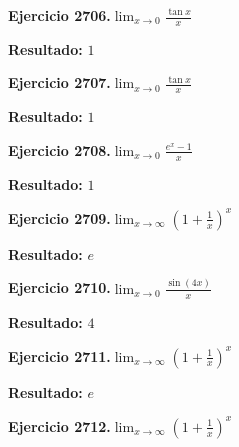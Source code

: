 \documentclass[10pt,a4paper]{article}
\begin{document}
\newpage
\begin{ejbox}
\textbf{Ejercicio 2706.}\quad $\lim_{x\to 0} \frac{\tan x}{x}$
\end{ejbox}

\begin{solbox}
\textbf{Resultado:} \(\displaystyle 1\)
\end{solbox}

\begin{ejbox}
\textbf{Ejercicio 2707.}\quad $\lim_{x\to 0} \frac{\tan x}{x}$
\end{ejbox}

\begin{solbox}
\textbf{Resultado:} \(\displaystyle 1\)
\end{solbox}

\begin{ejbox}
\textbf{Ejercicio 2708.}\quad $\lim_{x\to 0} \frac{e^x-1}{x}$
\end{ejbox}

\begin{solbox}
\textbf{Resultado:} \(\displaystyle 1\)
\end{solbox}

\newpage
\begin{ejbox}
\textbf{Ejercicio 2709.}\quad $\lim_{x\to \infty} \left(1+\frac{1}{x}\right)^x$
\end{ejbox}

\begin{solbox}
\textbf{Resultado:} \(\displaystyle e\)
\end{solbox}

\begin{ejbox}
\textbf{Ejercicio 2710.}\quad $\lim_{x\to 0} \frac{\sin(4x)}{x}$
\end{ejbox}

\begin{solbox}
\textbf{Resultado:} \(\displaystyle 4\)
\end{solbox}

\begin{ejbox}
\textbf{Ejercicio 2711.}\quad $\lim_{x\to \infty} \left(1+\frac{1}{x}\right)^x$
\end{ejbox}

\begin{solbox}
\textbf{Resultado:} \(\displaystyle e\)
\end{solbox}

\newpage
\begin{ejbox}
\textbf{Ejercicio 2712.}\quad $\lim_{x\to \infty} \left(1+\frac{1}{x}\right)^x$
\end{ejbox}
\end{document}

